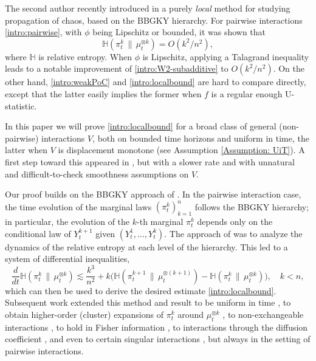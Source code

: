 \documentclass[11pt,reqno]{amsart}
\numberwithin{equation}{section}
\theoremstyle{definition}
\newcommand{\ent}{ \mathbb H}
\begin{document}
The second author recently introduced in \cite{HierarchiesPaper} a purely \emph{local} method for studying propagation of chaos, based on the BBGKY hierarchy.
For pairwise interactions \eqref{intro:pairwise}, with $\phi$ being Lipschitz or bounded, it was shown that
\begin{equation}
\ent(\pi_t^k\,\|\,\mu_t^{\otimes k})= O(k^2/n^2), \label{intro:localbound}
\end{equation}
where $\ent$ is relative entropy.  When $\phi$ is Lipschitz, applying a Talagrand inequality leads to a notable improvement of \eqref{intro:W2-subadditive} to $O(k^2/n^2)$. On the other hand, \eqref{intro:weakPoC} and \eqref{intro:localbound} are hard to compare directly, except that the latter easily implies the former when $f$ is a regular enough U-statistic.

In this paper we will prove \eqref{intro:localbound} for a broad class of general (non-pairwise) interactions $ V$, both on bounded time horizons and uniform in time, the latter when $V$ is displacement monotone (see Assumption \ref{Assumption: UiT}). A first step toward this appeared in \cite[Section 2D]{HierarchiesPaper}, but with a slower rate and with unnatural and difficult-to-check smoothness assumptions on $ V$.

Our proof builds on the BBGKY approach of \cite{HierarchiesPaper}. In the pairwise interaction case, the time evolution of the marginal laws $(\pi_t^k)_{k=1}^n$ follows the BBGKY hierarchy; in particular, the evolution of the $k$-th marginal $\pi_t^k$ depends only on the conditional law of $Y_t^{k+1}$ given $(Y_t^1,\dots,Y_t^k)$. The approach of \cite{HierarchiesPaper} was to analyze the dynamics of the relative entropy at each level of the hierarchy. This led to a system of differential inequalities,
\begin{equation}
    \label{eq: Hierarchy pairwise case}
    \frac{d}{dt}\ent(\pi^k_t\,\|\,\mu^{\otimes k}_t)\lesssim \frac{k^3}{n^2}+k\Big(\ent(\pi^{k+1}_t\,\|\,\mu^{\otimes (k+1)}_t)-\ent(\pi^k_t\,\|\,\mu^{\otimes k}_t)\Big), \quad k < n,
\end{equation}
which can then be used to derive the desired estimate \eqref{intro:localbound}.
Subsequent work extended this method and result to be uniform in time \cite{SharpChaosLacker2023,TimeUniformLSI}, to obtain higher-order (cluster) expansions of $\pi^k_t$ around $\mu^{\otimes k}_t$ \cite{Hess-Childs2025-ux}, to non-exchangeable interactions \cite{lacker2024quantitativepropagationchaosnonexchangeable}, to hold in Fisher information \cite{grass2025propagation}, to interactions through the diffusion coefficient \cite{sharpChaosDiffusion}, and even to certain singular interactions \cite{wang2024sharplocalpropagationchaos}, but always in the setting of pairwise interactions. 
\end{document}
